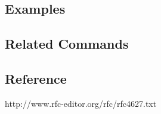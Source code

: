 \subsection*{Examples}

\subsection*{Related Commands}

\subsection*{Reference}
http://www.rfc-editor.org/rfc/rfc4627.txt

%
